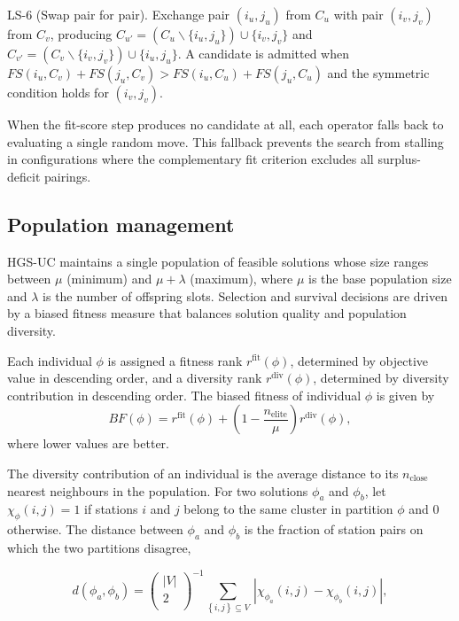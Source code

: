 LS-6 (Swap pair for pair). Exchange pair $({{i}_{u}},{{j}_{u}})$ from ${{C}_{u}}$ with pair $({{i}_{v}},{{j}_{v}})$ from ${{C}_{v}}$, producing ${{C}_{{{u}'}}}=({{C}_{u}}\backslash \{{{i}_{u}},{{j}_{u}}\})\cup \{{{i}_{v}},{{j}_{v}}\}$ and ${{C}_{{{v}'}}}=({{C}_{v}}\backslash \{{{i}_{v}},{{j}_{v}}\})\cup \{{{i}_{u}},{{j}_{u}}\}$. A candidate is admitted when $FS({{i}_{u}},{{C}_{v}})+FS({{j}_{u}},{{C}_{v}})>FS({{i}_{u}},{{C}_{u}})+FS({{j}_{u}},{{C}_{u}})$ and the symmetric condition holds for $({{i}_{v}},{{j}_{v}})$.

When the fit-score step produces no candidate at all, each operator falls back to evaluating a single random move. This fallback prevents the search from stalling in configurations where the complementary fit criterion excludes all surplus-deficit pairings.

\subsection{Population management}\label{ch3:subsec:population-management}

HGS-UC maintains a single population of feasible solutions whose size ranges between $\mu $ (minimum) and $\mu +\lambda $ (maximum), where $\mu $ is the base population size and $\lambda $ is the number of offspring slots. Selection and survival decisions are driven by a biased fitness measure that balances solution quality and population diversity.

Each individual $\phi$ is assigned a fitness rank $r^{\mathrm{fit}}(\phi)$, determined by objective value in descending order, and a diversity rank $r^{\mathrm{div}}(\phi)$, determined by diversity contribution in descending order. The biased fitness of individual $\phi$ is given by
\begin{equation}
BF(\phi)=r^{\mathrm{fit}}(\phi)+\left(1-\frac{n_{\mathrm{elite}}}{\mu}\right)r^{\mathrm{div}}(\phi),
\end{equation}
where lower values are better.

The diversity contribution of an individual is the average distance to its ${{n}_{\text{close}}}$ nearest neighbours in the population. For two solutions ${{\phi }_{a}}$ and ${{\phi }_{b}}$, let ${{\chi }_{\phi }}\left( i,j \right)=1$ if stations $i$ and $j$ belong to the same cluster in partition $\phi $ and $0$ otherwise. The distance between ${{\phi }_{a}}$ and ${{\phi }_{b}}$ is the fraction of station pairs on which the two partitions disagree,

\begin{equation}
d\left( {{\phi }_{a}},{{\phi }_{b}} \right)={{\left( \begin{matrix}
\left| V \right|  \\
2  \\
\end{matrix} \right)}^{-1}}\underset{\left\{ i,j \right\}\subseteq V}{\mathop \sum }\,\left| {{\chi }_{{{\phi }_{a}}}}\left( i,j \right)-{{\chi }_{{{\phi }_{b}}}}\left( i,j \right) \right|,
\end{equation}

